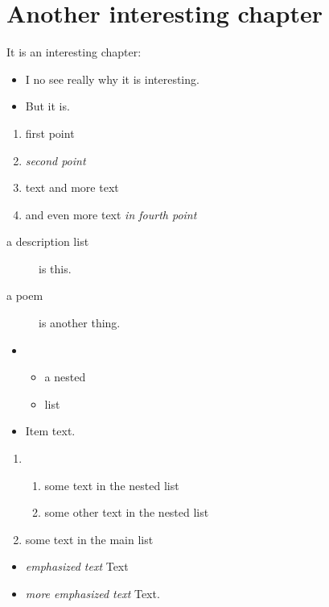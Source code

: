 \chapter{Another interesting chapter}
\label{s:2}
It is an interesting chapter:
\begin{itemize}
\item I no see really why it is interesting.
\item But it is.
\end{itemize}
\begin{enumerate}
\item first point

\item \emph{second point}
\item text 
and more text
\item and even more text
\emph{in fourth point}
\end{enumerate}
\begin{description}
\item[a description list]
is this.
\item[a poem]
is another thing.
\end{description}
\begin{itemize}
\item \begin{itemize}
\item a nested
\item list
\end{itemize}

\item Item text.
\end{itemize}
\begin{enumerate}
\item \begin{enumerate}
\item some text in the nested list

\item some other text in the nested list

\end{enumerate}

\item some text in the main list

\end{enumerate}
\begin{itemize}
\item \emph{emphasized text}
Text
\item \emph{more emphasized text}
Text.
\end{itemize}
